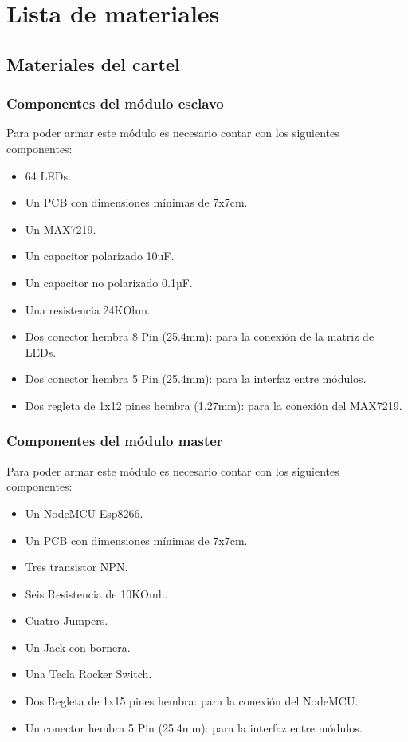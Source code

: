 \section{Lista de materiales}\label{sec:materiales}

\subsection{Materiales del cartel}

\subsubsection{Componentes del módulo esclavo}
Para poder armar este módulo es necesario contar con los siguientes componentes:
\begin{itemize}
    \item 64 LEDs.
    \item Un PCB con dimensiones mínimas de 7x7cm.
    \item Un MAX7219.
    \item Un capacitor polarizado 10µF.
    \item Un capacitor no polarizado 0.1µF.
    \item Una resistencia 24KOhm.
    \item Dos conector hembra 8 Pin (25.4mm): para la conexión de la matriz de LEDs.
    \item Dos conector hembra 5 Pin (25.4mm): para la interfaz entre módulos.
    \item Dos regleta de 1x12 pines hembra (1.27mm): para la conexión del MAX7219.
\end{itemize}    

\subsubsection{Componentes del módulo master}
Para poder armar este módulo es necesario contar con los siguientes componentes:
\begin{itemize}
    \item Un NodeMCU Esp8266.
    \item Un PCB con dimensiones mínimas de 7x7cm.
    \item Tres transistor NPN.
    \item Seis Resistencia de 10KOmh.
    \item Cuatro Jumpers.
    \item Un Jack con bornera.
    \item Una Tecla Rocker Switch.
    \item Dos Regleta de 1x15 pines hembra: para la conexión del NodeMCU.
    \item Un conector hembra 5 Pin (25.4mm): para la interfaz entre módulos.
\end{itemize}

